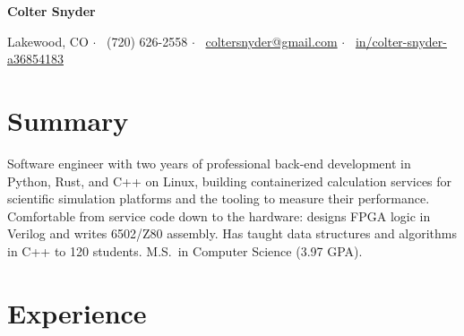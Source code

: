 \documentclass[letterpaper,10pt]{article}
\begin{document}
\begin{center}
  {\Huge\bfseries Colter Snyder}\par\vspace{4pt}
  \small
  Lakewood, CO \enspace$\cdot$\enspace
  \faPhone*\ (720) 626-2558 \enspace$\cdot$\enspace
  \faEnvelope\ \href{mailto:coltersnyder@gmail.com}{coltersnyder@gmail.com} \enspace$\cdot$\enspace
  \faLinkedin\ \href{https://www.linkedin.com/in/colter-snyder-a36854183/}{in/colter-snyder-a36854183}
\end{center}

\section{Summary}
Software engineer with two years of professional back-end development in Python, Rust, and C++ on Linux, building
containerized calculation services for scientific simulation platforms and the tooling to measure their performance.
Comfortable from service code down to the hardware: designs FPGA logic in Verilog and writes 6502/Z80 assembly.
Has taught data structures and algorithms in C++ to 120 students. M.S.\ in Computer Science (3.97 GPA).

\section{Experience}
\end{document}
